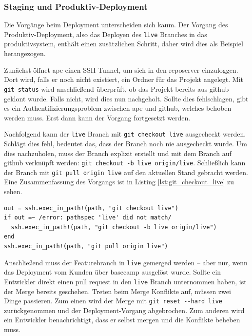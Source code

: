
\subsubsection{Staging und Produktiv-Deployment} %
\label{ssub:staging_und_produktiv_deployment}

Die Vorgänge beim Deployment unterscheiden sich kaum. Der Vorgang des Produktiv-Deployment, also das Deployen des \lstinline!live! Branches in das \gls{produktivsystem}, enthält einen zusätzlichen Schritt, daher wird dies als Beispiel herangezogen.

Zunächst öffnet \gls{ape} einen SSH Tunnel, um sich in den \gls{reposerver} einzuloggen. Dort wird, falls er noch nicht existiert, ein Ordner für das Projekt angelegt. Mit \lstinline!git status! wird anschließend überprüft, ob das Projekt bereits aus \gls{github} geklont wurde. Falls nicht, wird dies nun nachgeholt. Sollte dies fehlschlagen, gibt es ein Authentifizierungsproblem zwischen \gls{ape} und \gls{github}, welches behoben werden muss. Erst dann kann der Vorgang fortgesetzt werden.

Nachfolgend kann der \lstinline!live! Branch mit \lstinline!git checkout live! ausgecheckt werden. Schlägt dies fehl, bedeutet das, dass der Branch noch nie ausgecheckt wurde. Um dies nachzuholen, muss der Branch explizit erstellt und mit dem Branch auf \gls{github} verknüpft werden: \lstinline!git checkout -b live origin/live!. Schließlich kann der Branch mit \lstinline!git pull origin live! auf den aktuellen Stand gebracht werden. Eine Zusammenfassung des Vorgangs ist in Listing \ref{lst:git_checkout_live} zu sehen.

\begin{lstlisting}[caption=Wechsel auf den aktualisierten Deployment Branch,label={lst:git_checkout_live}]
out = ssh.exec_in_path!(path, "git checkout live")
if out =~ /error: pathspec 'live' did not match/
  ssh.exec_in_path!(path, "git checkout -b live origin/live")
end
ssh.exec_in_path!(path, "git pull origin live")
\end{lstlisting}

Anschließend muss der Featurebranch in \lstinline!live! gemerged werden -- aber nur, wenn das Deployment vom Kunden über \gls{basecamp} ausgelöst wurde. Sollte ein Entwickler direkt einen \gls{pull request} in den \lstinline!live! Branch unternommen haben, ist der Merge bereits geschehen. Treten beim Merge Konflikte auf, müssen zwei Dinge passieren. Zum einen wird der Merge mit \lstinline!git reset --hard live! zurückgenommen und der Deployment-Vorgang abgebrochen. Zum anderen wird ein Entwickler benachrichtigt, dass er selbst mergen und die Konflikte beheben muss.

